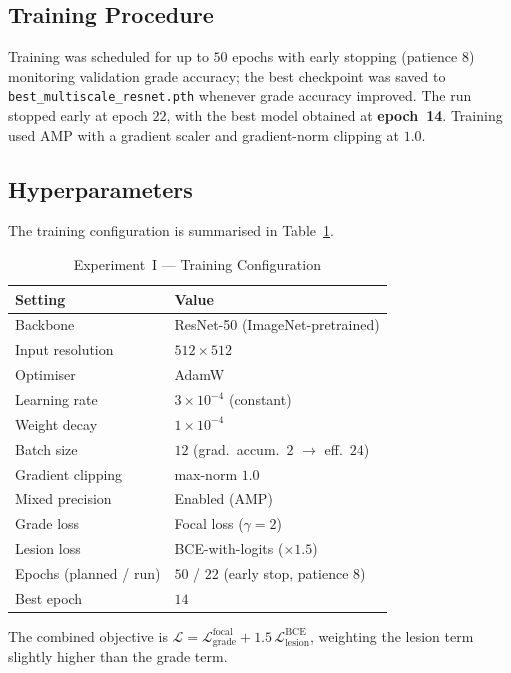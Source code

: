 \documentclass[journal,twoside,web]{ieeecolor}
\begin{document}
\subsection{Training Procedure}
Training was scheduled for up to $50$ epochs with early stopping (patience $8$)
monitoring validation grade accuracy; the best checkpoint was saved to
\texttt{best\_multiscale\_resnet.pth} whenever grade accuracy improved. The run
stopped early at epoch $22$, with the best model obtained at \textbf{epoch~14}.
Training used AMP with a gradient scaler and gradient-norm clipping at $1.0$.

\subsection{Hyperparameters}
The training configuration is summarised in Table~\ref{tab:exp1_hyper}.

\begin{table}[!t]
\caption{Experiment~I --- Training Configuration}
\label{tab:exp1_hyper}
\centering
\setlength{\tabcolsep}{5pt}
\begin{tabular}{|l|l|}
\hline
\textbf{Setting} & \textbf{Value} \\
\hline
Backbone & ResNet-50 (ImageNet-pretrained) \\
Input resolution & $512\times512$ \\
Optimiser & AdamW \\
Learning rate & $3\times10^{-4}$ (constant) \\
Weight decay & $1\times10^{-4}$ \\
Batch size & $12$ (grad.\ accum.\ $2$ $\rightarrow$ eff.\ $24$) \\
Gradient clipping & max-norm $1.0$ \\
Mixed precision & Enabled (AMP) \\
Grade loss & Focal loss ($\gamma=2$) \\
Lesion loss & BCE-with-logits ($\times1.5$) \\
Epochs (planned / run) & $50$ / $22$ (early stop, patience $8$) \\
Best epoch & $14$ \\
\hline
\end{tabular}
\end{table}

The combined objective is
$\mathcal{L}=\mathcal{L}_{\text{grade}}^{\text{focal}}+1.5\,
\mathcal{L}_{\text{lesion}}^{\text{BCE}}$, weighting the lesion term slightly
higher than the grade term.
\end{document}
